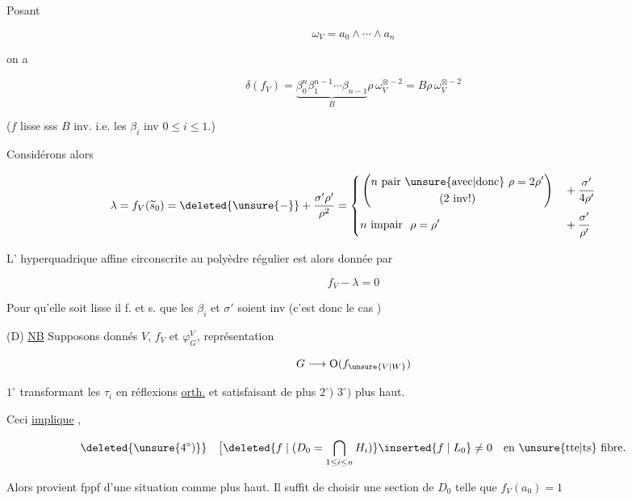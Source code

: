 
Posant

\[
\omega_V=a_0\wedge\cdots\wedge a_n
\]

on a

\[
\delta(f_V)=\underbrace{\beta_0^n\beta_1^{n-1}\cdots\beta_{n-1}}_{B}
 \rho\,\omega_V^{\otimes-2}=B\rho\,\omega_V^{\otimes-2}
\]

($f$ lisse sss $B$ inv. i.e. les $\beta_i$ inv \quad $0\le i\le1$.)

Considérons alors

\[
\lambda=f_V(\widetilde{s}_0)=\deleted{\unsure{-}}+
\frac{\sigma'\rho'}{\rho^2}
=\left\{\begin{aligned}
&\left(\begin{gathered}n\text{ pair \unsure{avec|donc} }\rho=2\rho'\\(2\text{ inv!})\end{gathered}\right)
&&+\frac{\sigma'}{4\rho'}\\
&n\text{ impair }\ \rho=\rho'&&+\frac{\sigma'}{\rho'}
\end{aligned}\right.
\]

L' hyperquadrique affine circonscrite au polyèdre régulier est alors donnée par

\[
f_V-\lambda=0
\]

Pour qu'elle soit   lisse il f. et s. que les $\beta_i$ et $\sigma'$ soient inv (c'est donc le cas \uline{})

(D) \uline{NB} Supposons donnés $V$, $f_V$ et $\varphi_G^V$, représentation 

\[
G\longrightarrow \mathrm O(f_{\unsure{V|W}})
\]

$1^\circ$ transformant les $\tau_i$ en réflexions \uline{orth.} et satisfaisant de plus $2^\circ)$ $3^\circ)$ plus haut.

Ceci \uline{implique} ,

\[
\deleted{\unsure{4^\circ)}}\quad
\bigl[\deleted{f\mid(D_0=\bigcap_{1\le i\le n}H_i)}
\inserted{f\mid L_0}\ne0\quad\text{en \unsure{tte|ts} fibre.}
\]


Alors  provient  fppf d'une situation comme plus haut. Il suffit de choisir une section  de $D_0$ telle que $f_V(a_0)=1$
